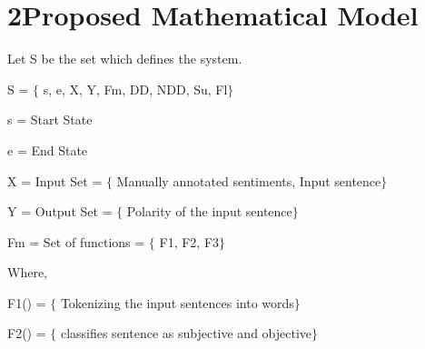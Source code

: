 \documentclass[12pt]{article}
\begin{document}
\vspace{\baselineskip}

\vspace{\baselineskip}

\vspace{\baselineskip}

\vspace{\baselineskip}
\begin{justify}
 
\end{justify}\par

\begin{justify}
 
\end{justify}\par

\section*{2\hspace*{10pt}Proposed Mathematical Model}
\textcolor[HTML]{00000A}{Let S be the set which defines the system.}\par

\textcolor[HTML]{00000A}{S = $ \{ $ s, e, X, Y, Fm, DD, NDD, Su, Fl$ \} $ }\par

\textcolor[HTML]{00000A}{s = Start State}\par

\textcolor[HTML]{00000A}{e = End State}\par

\textcolor[HTML]{00000A}{X = Input Set = $ \{ $ Manually annotated sentiments, Input sentence$ \} $ }\par

\textcolor[HTML]{00000A}{Y = Output Set = $ \{ $ Polarity of the input sentence$ \} $ }\par

\textcolor[HTML]{00000A}{Fm = Set of functions = $ \{ $ F1, F2, F3$ \} $ }\par

\textcolor[HTML]{00000A}{Where,}\par

\textcolor[HTML]{00000A}{F1() = $ \{ $ Tokenizing the input sentences into words$ \} $ }\par

\textcolor[HTML]{00000A}{F2() = $ \{ $ classifies sentence as subjective and objective$ \} $ }\par
\end{document}
